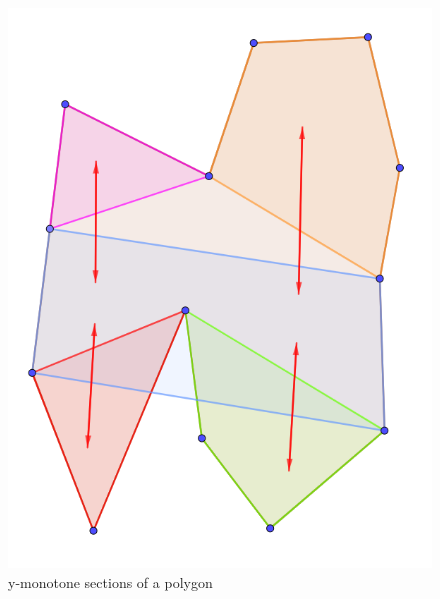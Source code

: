 \documentclass[12pt]{article}
\begin{document}
\begin{figure}[H]
    \includegraphics[width=\linewidth]{Images/intersection_yMonotoneSections.png}
    \caption{y-monotone sections of a polygon}
    \label{fig:intersectionPolygonSections}
    \endminipage
\end{figure}
\end{document}
